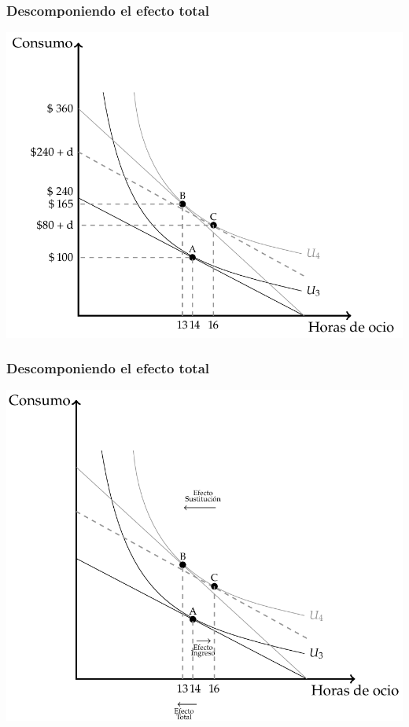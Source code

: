 \documentclass{beamer}
\begin{document}
\begin{frame}
\frametitle{Descomponiendo el efecto total}
\begin{center}
\includegraphics[scale=0.5]{../Figures/C9.10.png}
\end{center}
\end{frame}

\begin{frame}
\frametitle{Descomponiendo el efecto total}
\begin{center}
\includegraphics[scale=0.5]{../Figures/C9.11.png}
\end{center}
\end{frame}
\end{document}
